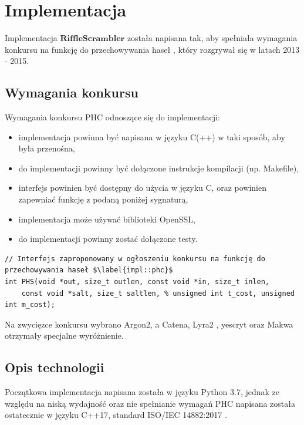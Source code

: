 \chapter{Implementacja}
\thispagestyle{chapterBeginStyle}
\label{rozdzial3}

Implementacja $\mathbf{RiffleScrambler}$ została napisana tak, aby spełniała wymagania konkursu na funkcję do przechowywania haseł \cite[PHC, ang \textit{Password Hashing Competition}]{phc}, który rozgrywał się w latach 2013 - 2015.

\section{Wymagania konkursu}
Wymagania konkursu PHC odnoszące się do implementacji:
\begin{itemize}
	\item implementacja powinna być napisana w języku C(++) w taki sposób, aby była przenośna,
	\item do implementacji powinny być dołączone instrukcje kompilacji (np. Makefile),
	\item interfejs powinien być dostępny do użycia w języku C, oraz powinien zapewniać funkcję z podaną poniżej sygnaturą,
	\item implementacja może używać biblioteki OpenSSL,
	\item do implementacji powinny zostać dołączone testy.
\end{itemize}

\begin{verbatim}
// Interfejs zaproponowany w ogłoszeniu konkursu na funkcję do przechowywania haseł $\label{impl::phc}$
int PHS(void *out, size_t outlen, const void *in, size_t inlen,
	const void *salt, size_t saltlen, % unsigned int t_cost, unsigned int m_cost); 
\end{verbatim}

Na zwycięzce konkursu wybrano Argon2, a Catena, Lyra2 \cite{simplicio2015lyra2}, yescryt \cite{peslyak2014yescrypt} oraz Makwa \cite{pornin2015makwa} otrzymały specjalne wyróżnienie.

\section{Opis technologii}
Początkowa implementacja napisana została w języku Python 3.7, jednak ze względu na niską wydajność oraz nie spełnianie wymagań PHC napisana została ostatecznie w języku C++17, standard ISO/IEC 14882:2017 \cite{cpp17}.

